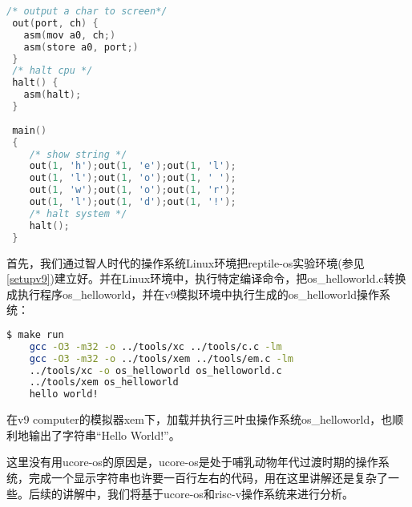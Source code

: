  \begin{lstlisting}[language={C}]
 /* output a char to screen*/
 out(port, ch) { 
   asm(mov a0, ch;)
   asm(store a0, port;) 
 }
 /* halt cpu */
 halt() { 
   asm(halt);
 }
 
 main()
 {
    /* show string */
 	out(1, 'h');out(1, 'e');out(1, 'l');
 	out(1, 'l');out(1, 'o');out(1, ' ');
 	out(1, 'w');out(1, 'o');out(1, 'r');
 	out(1, 'l');out(1, 'd');out(1, '!');
 	/* halt system */
 	halt();
 }
 \end{lstlisting}
 
首先，我们通过智人时代的操作系统Linux环境把reptile-os实验环境(参见\ref{setupv9})建立好。并在Linux环境中，执行特定编译命令，把os\_helloworld.c转换成执行程序os\_helloworld，并在v9模拟环境中执行生成的os\_helloworld操作系统：
\begin{lstlisting}[language={bash}]
	$ make run
	gcc -O3 -m32 -o ../tools/xc ../tools/c.c -lm
	gcc -O3 -m32 -o ../tools/xem ../tools/em.c -lm
	../tools/xc -o os_helloworld os_helloworld.c
	../tools/xem os_helloworld
	hello world!
\end{lstlisting}

在v9 computer的模拟器xem下，加载并执行三叶虫操作系统os\_helloworld，也顺利地输出了字符串“Hello World!”。


\begin{note} 
这里没有用ucore-os的原因是，ucore-os是处于哺乳动物年代过渡时期的操作系统，完成一个显示字符串也许要一百行左右的代码，用在这里讲解还是复杂了一些。后续的讲解中，我们将基于ucore-os和risc-v操作系统来进行分析。
\end{note} 